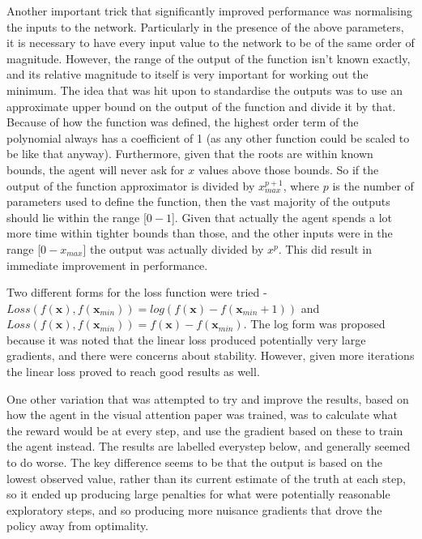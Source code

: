 Another important trick that significantly improved performance was normalising the inputs to the network. Particularly in the presence of the above parameters, it is necessary to have every input value to the network to be of the same order of magnitude. However, the range of the output of the function isn't known exactly, and its relative magnitude to itself is very important for working out the minimum. The idea that was hit upon to standardise the outputs was to use an approximate upper bound on the output of the function and divide it by that. Because of how the function was defined, the highest order term of the polynomial always has a coefficient of 1 (as any other function could be scaled to be like that anyway). Furthermore, given that the roots are within known bounds, the agent will never ask for $x$ values above those bounds. So if the output of the function approximator is divided by $x_{max}^{p+1}$, where $p$ is the number of parameters used to define the function, then the vast majority of the outputs should lie within the range [$0 - 1$]. Given that actually the agent spends a lot more time within tighter bounds than those, and the other inputs were in the range [$0- x_{max} $] the output was actually divided by $x^p$. This did result in immediate improvement in performance.

Two different forms for the loss function were tried - $Loss(f(\boldsymbol{x}), f(\boldsymbol{x}_{min})) = log(f(\boldsymbol{x}) - f(\boldsymbol{x}_{min} +1))$ and $Loss(f(\boldsymbol{x}), f(\boldsymbol{x}_{min})) = f(\boldsymbol{x}) - f(\boldsymbol{x}_{min})$. The log form was proposed because it was noted that the linear loss produced potentially very large gradients, and there were concerns about stability. However, given more iterations the linear loss proved to reach good results as well.

One other variation that was attempted to try and improve the results, based on how the agent in the visual attention paper \cite{RVA} was trained, was to calculate what the reward would be at every step, and use the gradient based on these to train the agent instead. The results are labelled everystep below, and generally seemed to do worse. The key difference seems to be that the output is based on the lowest observed value, rather than its current estimate of the truth at each step, so it ended up producing large penalties for what were potentially reasonable exploratory steps, and so producing more nuisance gradients that drove the policy away from optimality.

